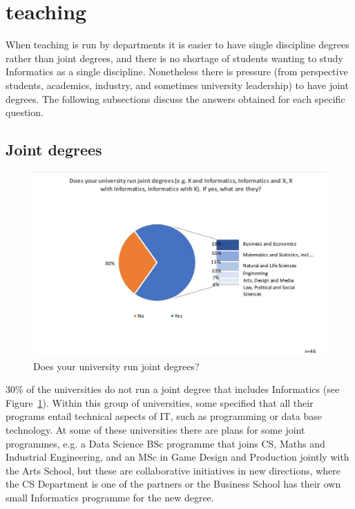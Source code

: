 \section{teaching}

When teaching is run by departments it is easier to have single discipline degrees rather than joint degrees, and there is no shortage of students wanting to study Informatics as a single discipline. Nonetheless there is pressure (from perspective students, academics, industry, and sometimes university leadership) to have joint degrees. The 
following subsections discuss the answers obtained for each specific
question.

\subsection {Joint degrees}

\begin{figure}[h]
\includegraphics[width = \linewidth]{charts/2a.jpg}
\caption{Does your university run joint degrees?}
\label{sect3:joint}
\end{figure}

30\% of the universities do not run a joint degree that includes Informatics (see Figure~\ref{sect3:joint}). Within this group of universities, some specified that all their programs entail technical aspects of IT, such as programming or data base technology.  At some of these universities there are plans for some joint programmes, e.g. a Data Science BSc programme that joins CS, Maths and Industrial Engineering, and an MSc in Game Design and Production jointly with the Arts School, but these are collaborative initiatives in new directions, where the CS Department is one of the partners or the Business School has their own small Informatics programme for the new degree.

